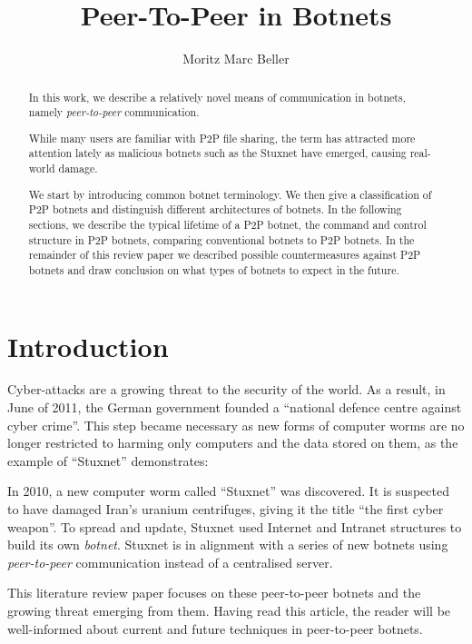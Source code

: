 \documentclass{llncs}
\title{Peer-To-Peer in Botnets}
\author{Moritz Marc Beller}
\institute{%
   Fakultät für Informatik, \\
   Technische Universität München \\
   \email{\{beller\}@in.tum.de}
}
\begin{document}
\maketitle

\begin{abstract}
In this work, we describe a relatively novel means of communication in
botnets, namely {\it peer-to-peer} communication.  

While many users are familiar with P2P file sharing, the term has
attracted more attention lately as malicious botnets such as the
Stuxnet have emerged, causing real-world damage.

We start by introducing common botnet terminology. We then give a
classification of P2P botnets and distinguish different architectures
of botnets. In the following sections, we describe the typical
lifetime of a P2P botnet, the command and control structure in P2P
botnets, comparing conventional botnets to P2P botnets. In the
remainder of this review paper we described possible countermeasures
against P2P botnets and draw conclusion on what types of botnets to
expect in the future.
\end{abstract}

\section{Introduction}

Cyber-attacks are a growing threat to the security of the world. As a
result, in June of 2011, the German government founded a ``national
defence centre against cyber crime''.\cite{cyber} This step became
necessary as new forms of computer worms are no longer restricted to
harming only computers and the data stored on them, as the example of
``Stuxnet'' demonstrates:

 In 2010, a new computer worm called ``Stuxnet'' was discovered. It is
 suspected to have damaged Iran's uranium centrifuges, giving it the
 title ``the first cyber weapon''\cite{benzin2011first}. To spread and
 update, Stuxnet used Internet and Intranet structures to build its
 own {\it botnet}.\cite{fallierew32} Stuxnet is in alignment with a series
 of new botnets using {\it peer-to-peer} communication instead of a
 centralised server. 

This literature review paper focuses on these peer-to-peer botnets and
the growing threat emerging from them. Having read this article, the
reader will be well-informed about current and future techniques in
peer-to-peer botnets.
\end{document}
